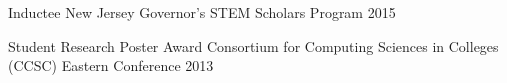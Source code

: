 
\begin{cvhonors}

  \cvhonor
    {Inductee} %
    {New Jersey Governor's STEM Scholars Program} %
    {2015} %

  \cvhonor
    {Student Research Poster Award} %
    {Consortium for Computing Sciences in Colleges (CCSC) Eastern Conference} %
    {2013} %

\end{cvhonors}

